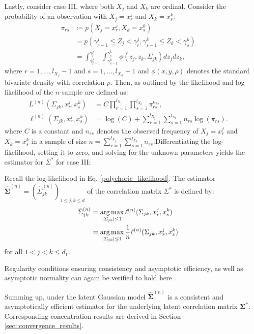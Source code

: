 Lastly, consider case III, where both $X_j$ and $X_k$ are ordinal. Consider the probability of an observation with $X_j = x_r^j$ and $X_k = x_s^k$:
\begin{equation}\label{cell_probabilities}
    \begin{split}
        \pi_{rs} &\coloneqq p(X_j = x_r^j, X_k = x_s^k) \\
        &= p(\gamma^j_{r-1} \leq Z_j < \gamma^j_r, \gamma^k_{s-1} \leq Z_k < \gamma^k_s) \\
        &= \int_{\gamma^j_{r-1}}^{\gamma^j_{r}} \int_{\gamma^k_{s-1}}^{\gamma^k_{s}} \phi(z_j,z_k,\Sigma_{jk}) dz_j dz_k,
    \end{split}
\end{equation}
where $r = 1, \dots, l_{X_j}-1$ and $s = 1, \dots, l_{X_k}-1$ and $\phi(x,y,\rho)$ denotes the standard bivariate density with correlation $\rho$. Then, as outlined by \citet{Olsson79} the likelihood and log-likelihood of the $n$-sample are defined as:
\begin{equation}\label{polychoric_likelihood}
    \begin{split}
        L^{(n)}(\Sigma_{jk}, x^j_r,x^k_s) &= C \prod_{r=1}^{l_{X_{j}}} \prod_{s=1}^{l_{X_{k}}} \pi_{rs}^{n_{rs}}, \\
        \ell^{(n)}(\Sigma_{jk}, x^j_r,x^k_s) &= \log(C) + \sum_{r=1}^{l_{X_{j}}}\sum_{s=1}^{l_{X_{k}}} n_{rs} \log(\pi_{rs}).
    \end{split}
\end{equation}
where $C$ is a constant and $n_{rs}$ denotes the observed frequency of $X_j = x_r^j$ and $X_k = x_s^k$ in a sample of size $n= \sum_{r=1}^{l_{X_{j}}}\sum_{s=1}^{l_{X_{k}}} n_{rs}$.Differentiating the log-likelihood, setting it to zero, and solving for the unknown parameters yields the estimator for $\Sigma^*$ for case III:
\begin{definition}\label{definition_case3}
    Recall the log-likelihood in Eq. \eqref{polychoric_likelihood}. The estimator $\hat{\mathbf{\Sigma}}^{(n)} = (\hat{\Sigma}_{jk}^{(n)})_{1\leq j, k\leq d}$ of the correlation matrix $\Sigma^*$ is defined by:
    \begin{equation}
        \begin{split}
            \hat{\Sigma}_{jk}^{(n)} &= \argmax_{\Abs{\Sigma_{jk}} \leq 1} \ell^{(n)}(\Sigma_{jk}, x^j_r,x^k_s) \\
            &= \argmax_{\Abs{\Sigma_{jk}} \leq 1} \frac{1}{n} \ell^{(n)}(\Sigma_{jk}, x^j_r,x^k_s)
        \end{split}
    \end{equation}
    for all $1 < j < k \leq d_1 $.
\end{definition}
\noindent Regularity conditions ensuring consistency and asymptotic efficiency, as well as asymptotic normality can again be verified to hold here \citep{Wallentin17}.

Summing up, under the latent Gaussian model $\hat{\mathbf{\Sigma}}^{(n)}$ is a consistent and asymptotically efficient estimator for the underlying latent correlation matrix $\mathbf{\Sigma}^{*}$. Corresponding concentration results are derived in Section \ref{sec::convergence_results}.